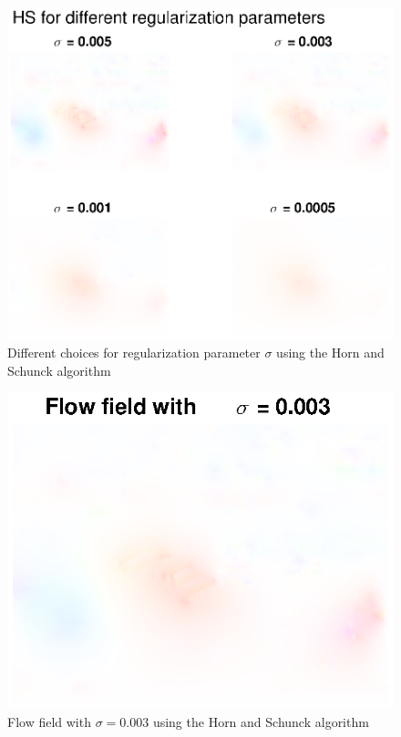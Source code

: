 \documentclass[10pt,a4paper]{article}
\begin{document}
\begin{figure}
    \centering
    \includegraphics[scale=0.8]{regularizationHS}
    \caption{Different choices for regularization parameter $\sigma$ using the Horn and Schunck algorithm}
    \label{reguHS}
\end{figure}

\begin{figure}
    \centering
    \includegraphics[scale=1]{HSregu}
    \caption{Flow field with $\sigma= 0.003$ using the Horn and Schunck algorithm}
    \label{reguHS_best}
\end{figure}
\end{document}
